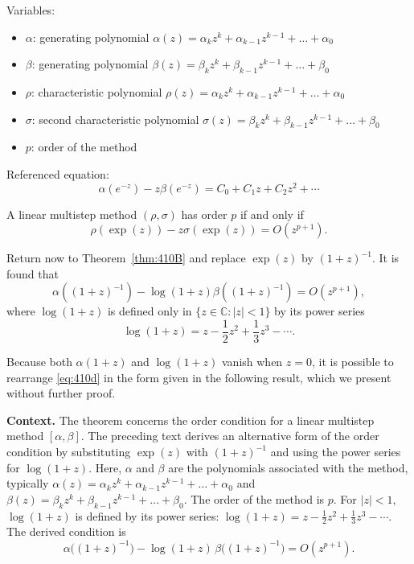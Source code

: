 Variables:
\begin{itemize}
    \item $\alpha$: generating polynomial $\alpha(z)=\alpha_k z^k+\alpha_{k-1}z^{k-1}+\dots+\alpha_0$
    \item $\beta$: generating polynomial $\beta(z)=\beta_k z^k+\beta_{k-1}z^{k-1}+\dots+\beta_0$
    \item $\rho$: characteristic polynomial $\rho(z)=\alpha_k z^k+\alpha_{k-1}z^{k-1}+\dots+\alpha_0$
    \item $\sigma$: second characteristic polynomial $\sigma(z)=\beta_k z^k+\beta_{k-1}z^{k-1}+\dots+\beta_0$
    \item $p$: order of the method
\end{itemize}

Referenced equation:
\begin{equation}
\alpha(e^{-z})-z\beta(e^{-z})=C_0+C_1z+C_2z^2+\cdots
\tag{410c}
\end{equation}

\begin{theorem}

  \label{thm:410C}
A linear multistep method $(\rho, \sigma)$ has order $p$ if and only if
\[
\rho(\exp(z)) - z\sigma(\exp(z)) = O(z^{p+1}).
\]

Return now to Theorem~\ref{thm:410B} and replace $\exp(z)$ by $(1 + z)^{-1}$. It is found that
\[
\alpha((1 + z)^{-1}) - \log(1 + z)\beta((1 + z)^{-1}) = O(z^{p+1}), \tag{410d}
\]
where $\log(1 + z)$ is defined only in $\{z \in \mathbb{C} : |z| < 1\}$ by its power series
\[
\log(1 + z) = z - \frac{1}{2}z^{2} + \frac{1}{3}z^{3} - \cdots .
\]

Because both $\alpha(1 + z)$ and $\log(1 + z)$ vanish when $z = 0$, it is possible to rearrange \eqref{eq:410d} in the form given in the following result, which we present without further proof.
\end{theorem}

\noindent\textbf{Context.}
The theorem concerns the order condition for a linear multistep method $[\alpha, \beta]$. The preceding text derives an alternative form of the order condition by substituting $\exp(z)$ with $(1+z)^{-1}$ and using the power series for $\log(1+z)$. Here, $\alpha$ and $\beta$ are the polynomials associated with the method, typically $\alpha(z) = \alpha_k z^k + \alpha_{k-1} z^{k-1} + \dots + \alpha_0$ and $\beta(z) = \beta_k z^k + \beta_{k-1} z^{k-1} + \dots + \beta_0$. The order of the method is $p$. For $|z|<1$, $\log(1+z)$ is defined by its power series: $\log(1+z) = z - \frac{1}{2}z^2 + \frac{1}{3}z^3 - \dotsb$. The derived condition is
\begin{equation}
\alpha\!\big((1+z)^{-1}\big) - \log(1+z)\,\beta\!\big((1+z)^{-1}\big) = O(z^{p+1}).
\tag{410d}
\end{equation}

